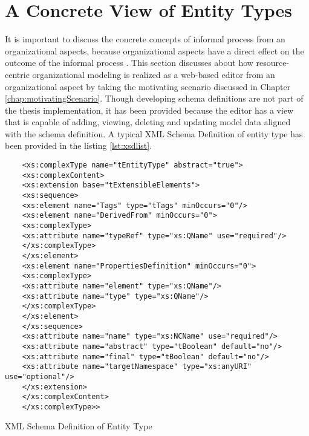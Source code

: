 \section{A Concrete View of Entity Types}
\label{sec:concreteviewofentitytypes}
It is important to discuss the concrete concepts of informal process from an organizational aspects, because organizational aspects have a direct effect on the outcome of the informal process \cite{Sungur2014}. This section discusses about how resource-centric organizational modeling is realized as a web-based editor from an organizational aspect by taking the motivating scenario discussed in Chapter \ref {chap:motivatingScenario}. Though developing schema definitions are not part of the thesis implementation, it has been provided because the editor has a view that is capable of adding, viewing, deleting and updating model data aligned with the schema definition. A typical XML Schema Definition of entity type has been provided in the listing \ref{lst:xsdlist}.

\begin{Listing}
	\begin{lstlisting}
	<xs:complexType name="tEntityType" abstract="true">
	<xs:complexContent>
	<xs:extension base="tExtensibleElements">
	<xs:sequence>
	<xs:element name="Tags" type="tTags" minOccurs="0"/>
	<xs:element name="DerivedFrom" minOccurs="0">
	<xs:complexType>
	<xs:attribute name="typeRef" type="xs:QName" use="required"/>
	</xs:complexType>
	</xs:element>
	<xs:element name="PropertiesDefinition" minOccurs="0">
	<xs:complexType>
	<xs:attribute name="element" type="xs:QName"/>
	<xs:attribute name="type" type="xs:QName"/>
	</xs:complexType>
	</xs:element>
	</xs:sequence>
	<xs:attribute name="name" type="xs:NCName" use="required"/>
	<xs:attribute name="abstract" type="tBoolean" default="no"/>
	<xs:attribute name="final" type="tBoolean" default="no"/>
	<xs:attribute name="targetNamespace" type="xs:anyURI" use="optional"/>
	</xs:extension>
	</xs:complexContent>
	</xs:complexType>>
	\end{lstlisting}
	\caption{XML Schema Definition of Entity Type}
	\label{lst:xsdlist}
\end{Listing}

